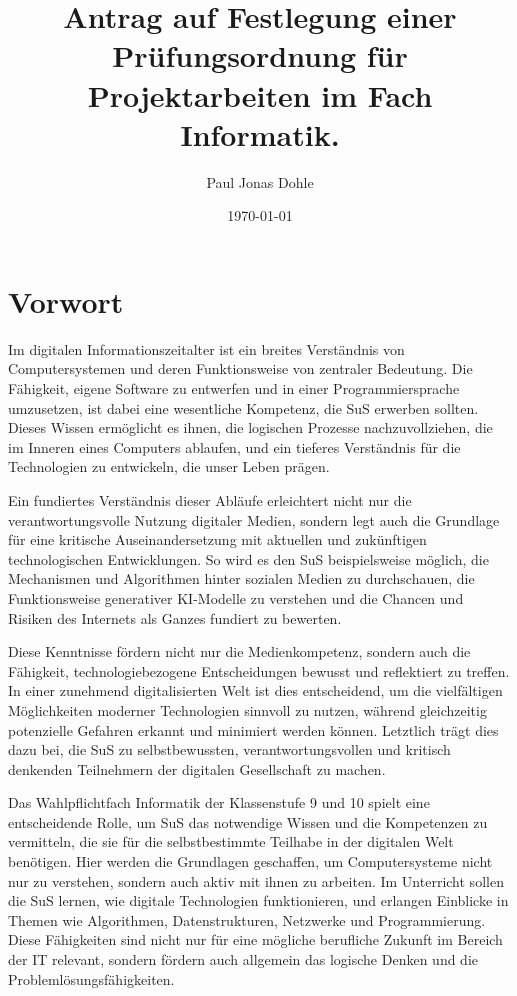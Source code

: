 \documentclass[a4paper,12pt]{article}
\title{Antrag auf Festlegung einer Prüfungsordnung für Projektarbeiten im Fach Informatik.}
\author{Paul Jonas Dohle}
\date{\today}
\begin{document}
\maketitle
\thispagestyle{empty} %
\newpage

\tableofcontents


\section{Vorwort}
Im digitalen Informationszeitalter ist ein breites Verständnis von Computersystemen und deren Funktionsweise von zentraler Bedeutung. Die Fähigkeit, eigene Software zu entwerfen und in einer Programmiersprache umzusetzen, ist dabei eine wesentliche Kompetenz, die SuS erwerben sollten. Dieses Wissen ermöglicht es ihnen, die logischen Prozesse nachzuvollziehen, die im Inneren eines Computers ablaufen, und ein tieferes Verständnis für die Technologien zu entwickeln, die unser Leben prägen.

Ein fundiertes Verständnis dieser Abläufe erleichtert nicht nur die verantwortungsvolle Nutzung digitaler Medien, sondern legt auch die Grundlage für eine kritische Auseinandersetzung mit aktuellen und zukünftigen technologischen Entwicklungen. So wird es den SuS beispielsweise möglich, die Mechanismen und Algorithmen hinter sozialen Medien zu durchschauen, die Funktionsweise generativer KI-Modelle zu verstehen und die Chancen und Risiken des Internets als Ganzes fundiert zu bewerten.

Diese Kenntnisse fördern nicht nur die Medienkompetenz, sondern auch die Fähigkeit, technologiebezogene Entscheidungen bewusst und reflektiert zu treffen. In einer zunehmend digitalisierten Welt ist dies entscheidend, um die vielfältigen Möglichkeiten moderner Technologien sinnvoll zu nutzen, während gleichzeitig potenzielle Gefahren erkannt und minimiert werden können. Letztlich trägt dies dazu bei, die SuS zu selbstbewussten, verantwortungsvollen und kritisch denkenden Teilnehmern der digitalen Gesellschaft zu machen.

Das Wahlpflichtfach Informatik der Klassenstufe 9 und 10 spielt eine entscheidende Rolle, um SuS das notwendige Wissen und die Kompetenzen zu vermitteln, die sie für die selbstbestimmte Teilhabe in der digitalen Welt benötigen. Hier werden die Grundlagen geschaffen, um Computersysteme nicht nur zu verstehen, sondern auch aktiv mit ihnen zu arbeiten. Im Unterricht sollen die SuS lernen, wie digitale Technologien funktionieren, und erlangen Einblicke in Themen wie Algorithmen, Datenstrukturen, Netzwerke und Programmierung. Diese Fähigkeiten sind nicht nur für eine mögliche berufliche Zukunft im Bereich der IT relevant, sondern fördern auch allgemein das logische Denken und die Problemlösungsfähigkeiten.
\end{document}

